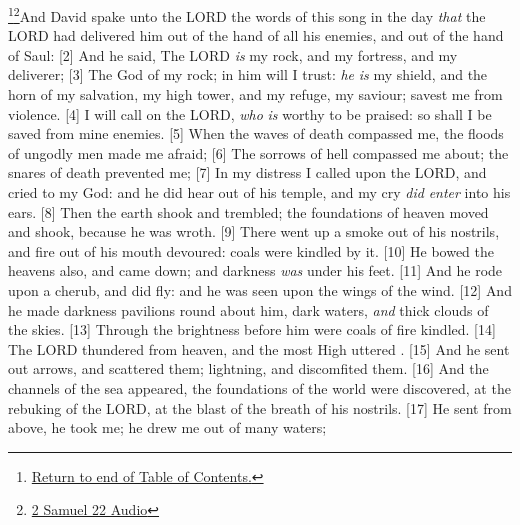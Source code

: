 \footnote{\textcolor[cmyk]{0.99998,1,0,0}{\hyperlink{TOC}{Return to end of Table of Contents.}}}\footnote{\href{https://audiobible.com/bible/2_samuel_22.html}{\textcolor[cmyk]{0.99998,1,0,0}{2 Samuel 22 Audio}}}\textcolor[cmyk]{0.99998,1,0,0}{And David spake unto the LORD the words of this song in the day \emph{that} the LORD had delivered him out of the hand of all his enemies, and out of the hand of Saul:}
[2] \textcolor[cmyk]{0.99998,1,0,0}{And he said, The LORD \emph{is} my rock, and my fortress, and my deliverer;}
[3] \textcolor[cmyk]{0.99998,1,0,0}{The God of my rock; in him will I trust: \emph{he} \emph{is} my shield, and the horn of my salvation, my high tower, and my refuge, my saviour;   savest me from violence.}
[4] \textcolor[cmyk]{0.99998,1,0,0}{I will call on the LORD, \emph{who} \emph{is} worthy to be praised: so shall I be saved from mine enemies.}
[5] \textcolor[cmyk]{0.99998,1,0,0}{When the waves of death compassed me, the floods of ungodly men made me afraid;}
[6] \textcolor[cmyk]{0.99998,1,0,0}{The sorrows of hell compassed me about; the snares of death prevented me;}
[7] \textcolor[cmyk]{0.99998,1,0,0}{In my distress I called upon the LORD, and cried to my God: and he did hear  out of his temple, and my cry \emph{did} \emph{enter} into his ears.}
[8] \textcolor[cmyk]{0.99998,1,0,0}{Then the earth shook and trembled; the foundations of heaven moved and shook, because he was wroth.}
[9] \textcolor[cmyk]{0.99998,1,0,0}{There went up a smoke out of his nostrils, and fire out of his mouth devoured: coals were kindled by it.}
[10] \textcolor[cmyk]{0.99998,1,0,0}{He bowed the heavens also, and came down; and darkness \emph{was} under his feet.}
[11] \textcolor[cmyk]{0.99998,1,0,0}{And he rode upon a cherub, and did fly: and he was seen upon the wings of the wind.}
[12] \textcolor[cmyk]{0.99998,1,0,0}{And he made darkness pavilions round about him, dark waters, \emph{and} thick clouds of the skies.}
[13] \textcolor[cmyk]{0.99998,1,0,0}{Through the brightness before him were coals of fire kindled.}
[14] \textcolor[cmyk]{0.99998,1,0,0}{The LORD thundered from heaven, and the most High uttered .}
[15] \textcolor[cmyk]{0.99998,1,0,0}{And he sent out arrows, and scattered them; lightning, and discomfited them.}
[16] \textcolor[cmyk]{0.99998,1,0,0}{And the channels of the sea appeared, the foundations of the world were discovered, at the rebuking of the LORD, at the blast of the breath of his nostrils.}
[17] \textcolor[cmyk]{0.99998,1,0,0}{He sent from above, he took me; he drew me out of many waters;}
